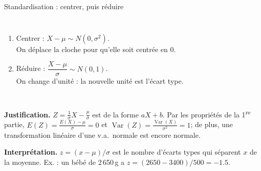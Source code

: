 \documentclass{BeamerTemplate}
\begin{document}
\begin{frame}[t]{Standardisation : centrer, puis réduire}
  \begin{columns}[T]
      \begin{enumerate}\itemsep 2mm
        \item \alert{Centrer} : $X - \mu \sim N(0, \sigma^2)$.\\
          {\small On déplace la cloche pour qu'elle soit centrée en 0.}
        \item \alert{Réduire} : $\dfrac{X - \mu}{\sigma} \sim N(0, 1)$.\\
          {\small On change d'unité : la nouvelle unité est l'écart type.}
      \end{enumerate}
  \end{columns}

  \smallskip
  \textbf{Justification.} $Z = \frac{1}{\sigma} X - \frac{\mu}{\sigma}$ est de
  la forme $aX + b$. Par les propriétés de la 1\textsuperscript{re} partie,
  $E(Z) = \frac{E(X) - \mu}{\sigma} = 0$ et
  $\operatorname{Var}(Z) = \frac{\operatorname{Var}(X)}{\sigma^2} = 1$; de
  plus, une transformation linéaire d'une v.a.\ normale est encore normale.

  \smallskip
  \textbf{Interprétation.} $z = (x - \mu)/\sigma$ est le \alert{nombre
  d'écarts types} qui séparent $x$ de la moyenne. Ex. : un bébé de 2\,650\,g a
  $z = (2650 - 3400)/500 = -1.5$.
\end{frame}
\end{document}
